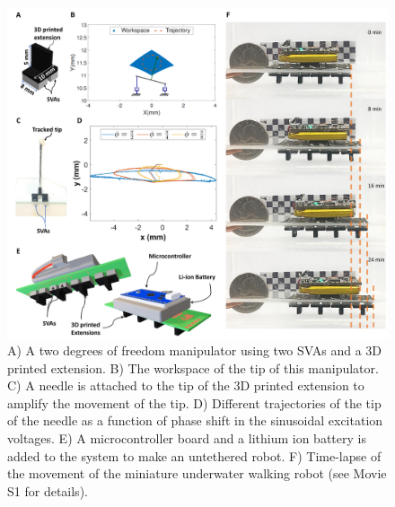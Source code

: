 \begin{figure}[!t]
      \centering
      \includegraphics[width=1\textwidth]{untethered_podia.pdf}
      \caption[Design and evaluation of untethered miniature underwater walking robot]{A) A two degrees of freedom manipulator using two SVAs and a 3D printed extension. B) The workspace of the tip of this manipulator. C) A needle is attached to the tip of the 3D printed extension to amplify the movement of the tip. D) Different trajectories of the tip of the needle as a function of phase shift in the sinusoidal excitation voltages. E) A microcontroller board and a lithium ion battery is added to the system to make an untethered robot. F) Time-lapse of the movement of the miniature underwater walking robot (see Movie S1 for details).}
      \label{fig:untethered_podia}
\end{figure}

